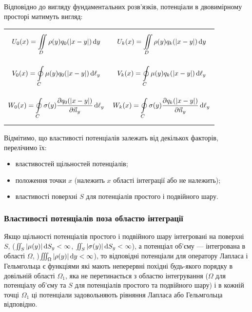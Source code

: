 Відповідно до вигляду фундаментальних розв'язків, потенціали в двовимірному просторі матимуть вигляд:
\begin{longtable}{p{} p{}}
	\parbox{.5\textwidth}{\begin{equation}
		\label{eq:4.8.5}
		U_0(x) = \displaystyle\iint\limits_D \rho(y) q_0(|x - y|) \mathop{}\!\mathrm{d} y
	\end{equation}} & \parbox{.5\textwidth}{\begin{equation}
		\label{eq:4.8.5'}
		U_k(x) = \displaystyle\iint\limits_D \rho(y) q_k(|x - y|) \mathop{}\!\mathrm{d} y
	\end{equation}} \\
	\parbox{.5\textwidth}{\begin{equation}
		\label{eq:4.8.6}
		V_0(x) = \displaystyle\oint\limits_C \mu(y) q_0(|x - y|) \mathop{}\!\mathrm{d} \ell_y
	\end{equation}} & \parbox{.5\textwidth}{\begin{equation}
		\label{eq:4.8.6'}
		V_k(x) = \displaystyle\oint\limits_C \mu(y) q_k(|x - y|) \mathop{}\!\mathrm{d} \ell_y
	\end{equation}} \\
	\parbox{.5\textwidth}{\begin{equation}
		\label{eq:4.8.7}
		W_0(x) = \displaystyle\oint\limits_C \sigma(y) \frac{\partial q_0(|x - y|)}{\partial \vec n_y} \mathop{}\!\mathrm{d} \ell_y
	\end{equation}} & \parbox{.5\textwidth}{\begin{equation}
		\label{eq:4.8.7'}
		W_k(x) = \displaystyle\oint\limits_C \sigma(y) \frac{\partial q_k(|x - y|)}{\partial \vec n_y} \mathop{}\!\mathrm{d} \ell_y
	\end{equation}}
\end{longtable}

Відмітимо, що властивості потенціалів залежать від декількох факторів, перелічимо їх:
\begin{itemize}
	\item властивостей щільностей потенціалів;
	\item положення точки $x$ (належить $x$ області інтеграції або не належить);
	\item властивості поверхні $S$ для потенціалів простого і подвійного шару.
\end{itemize}

\subsubsection{Властивості потенціалів поза областю інтеграції}

\begin{theorem}
	\label{th:4.8.1}
	Якщо щільності потенціалів простого і подвійного шару інтегровані на поверхні $S$, ($\iint_S |\mu(y)| \mathop{}\!\mathrm{d} S_y < \infty$, $\iint_S |\sigma(y)| \mathop{}\!\mathrm{d} S_y < \infty$), а потенціал об'єму --- інтегрована в області $\Omega$, )$\iiint_\Omega |\rho(y)| \mathop{}\!\mathrm{d} y < \infty$), то відповідні потенціали для оператору Лапласа і Гельмгольца є функціями які мають неперервні похідні будь-якого порядку в довільній області $\Omega_1$, яка не перетинається з областю інтегрування ($\Omega$ для потенціалу об'єму та $S$ для потенціалів простого та подвійного шару) і в кожній точці $\Omega_1$ ці потенціали задовольняють рівняння Лапласа або Гельмгольца відповідно.
\end{theorem}


